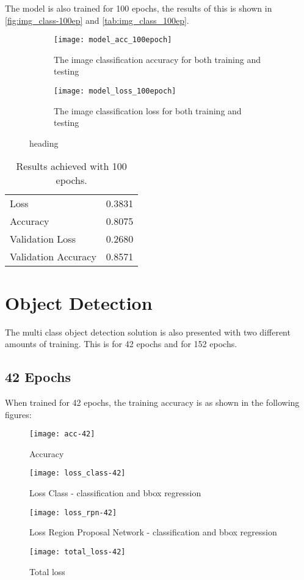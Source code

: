 The model is also trained for 100 epochs, the results of this is shown in \autoref{fig:img_class-100ep} and \autoref{tab:img_class_100ep}.
\begin{figure}[H]
	\centering
	\begin{subfigure}{0.48\textwidth}
		\texttt{[image: model\_acc\_100epoch]}
		\caption{The image classification accuracy for both training and testing}
		\label{fig:img_acc-100}
	\end{subfigure}
	\begin{subfigure}{0.48\textwidth}
		\texttt{[image: model\_loss\_100epoch]}
		\caption{The image classification loss for both training and testing}
		\label{fig:img_loss-100}
	\end{subfigure}
\caption{heading}
\label{fig:img_class-100ep}
\end{figure}

\begin{table}[H]
	\centering
	\caption{Results achieved with 100 epochs.}
	\begin{tabular}{|l|l|}
		\hline
		Loss                & 0.3831 \\\rowcolor{lightGrey}\hline
		Accuracy            & 0.8075 \\ \hline
		Validation Loss     & 0.2680 \\\rowcolor{lightGrey}\hline
		Validation Accuracy & 0.8571\\ \hline
	\end{tabular}
	\label{tab:img_class_100ep}
\end{table}

\section{Object Detection}
The multi class object detection solution is also presented with two different amounts of training. This is for 42 epochs and for 152 epochs.

\subsection{42 Epochs}
When trained for 42 epochs, the training accuracy is as shown in the following figures:
\begin{figure}[H]
	\centering
	\texttt{[image: acc-42]}
	\caption{Accuracy}
	\label{fig:acc-42}
\end{figure}
\begin{figure}[H]
	\centering
	\texttt{[image: loss\_class-42]}
	\caption{Loss Class - classification and bbox regression}
	\label{fig:loss_class-42}
\end{figure}
\begin{figure}[H]
	\centering
	\texttt{[image: loss\_rpn-42]}
	\caption{Loss Region Proposal Network - classification and bbox regression}
	\label{fig:loss_rpn-42}
\end{figure}
\begin{figure}[H]
	\centering
	\texttt{[image: total\_loss-42]}
	\caption{Total loss}
	\label{fig:total_loss-42}
\end{figure}

